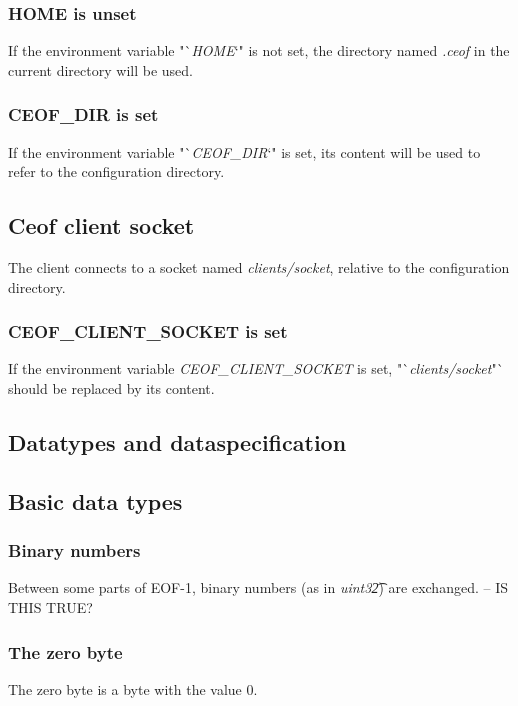 \documentclass[12pt,a4paper]{book}
\begin{document}
\subsubsection{HOME is unset}
If the environment variable "`\textit{HOME}`" is not set,
the directory named \textit{.ceof} in the current directory will be used.
\subsubsection{CEOF\_DIR is set}
If the environment variable "`\textit{CEOF\_DIR}`" is set,
its content will be used to refer to the configuration directory.
\subsection{Ceof client socket}
The client connects to a socket named \textit{clients/socket}, relative
to the configuration directory.
\subsubsection{CEOF\_CLIENT\_SOCKET is set}
If the environment variable \textit{CEOF\_CLIENT\_SOCKET} is set,
"`\textit{clients/socket}"` should be replaced by its content.
\subsection{Datatypes and dataspecification}
\subsection{Basic data types}
\subsubsection{Binary numbers}
Between some parts of EOF-1, binary numbers (as in \textit{uint32\t})
are exchanged. -- IS THIS TRUE?
\subsubsection{The zero byte}
The zero byte is a byte with the value 0.
\end{document}
